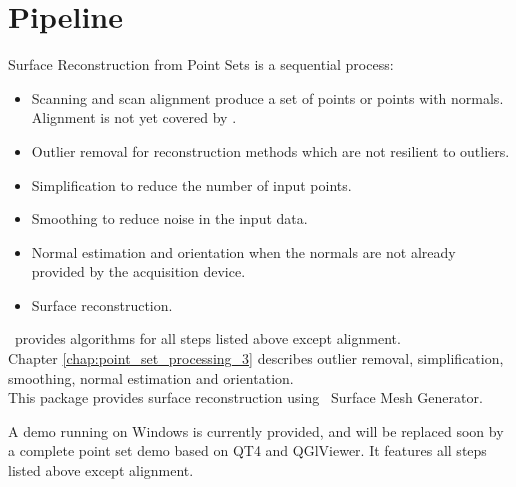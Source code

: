 \section{Pipeline}

Surface Reconstruction from Point Sets is a sequential process:

\begin{itemize}
\item Scanning and scan alignment produce a set of points
      or points with normals. Alignment is not yet
      covered by \cgal.
\item Outlier removal for reconstruction methods which
      are not resilient to outliers.
\item Simplification to reduce the number of input points.
\item Smoothing to reduce noise in the input data.
\item Normal estimation and orientation when the normals
      are not already provided by the acquisition device.
\item Surface reconstruction.
\end{itemize}

\cgal\ provides algorithms for all steps listed above except alignment.\\
Chapter  \ref{chap:point_set_processing_3} describes outlier removal, simplification, smoothing,
normal estimation and orientation.\\
This package provides surface reconstruction using \cgal\ Surface Mesh Generator.

A demo running on Windows is currently provided,
and will be replaced soon by a complete point set demo based on QT4 and QGlViewer.
It features all steps listed above except alignment.


